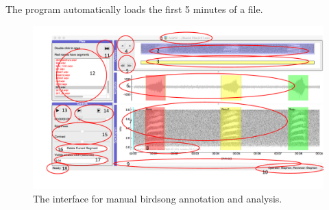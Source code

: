 \documentclass{article}
\begin{document}
The program automatically loads the first 5 minutes of a file. 

\begin{figure}[h!]
\centering
\includegraphics[width=.8\textwidth]{Figs/avianzinterface.pdf}
\caption{The interface for manual birdsong annotation and analysis.}
\label{main}
\end{figure}
\end{document}
